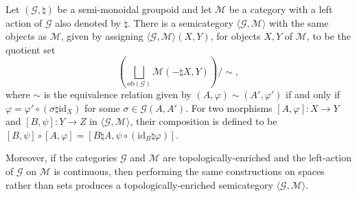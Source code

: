 \documentclass[AHL,Unicode,published]{cedram}
\newcommand{\obj}{\ensuremath{\mathrm{ob}}}
\newcommand{\id}{\mathrm{id}}
\newcommand{\cG}{\mathcal{G}}
\newcommand{\cM}{\mathcal{M}}
\begin{document}
\begin{prop}\label{prop:topological-Quillen}
Let $(\cG,\natural)$ be a semi-monoidal groupoid and let $\cM$ be a category with a left action of $\cG$ also denoted by $\natural$. There is a semicategory $\langle \cG,\cM \rangle$ with the same objects as $\cM$, given by assigning $\langle \cG,\cM \rangle(X,Y)$, for objects $X,Y$ of $\cM$, to be the quotient set
\[
\left(\bigsqcup_{\obj(\cG)} \cM(- \natural X,Y) \right) / {\sim},
\]
where $\sim$ is the equivalence relation given by $(A,\varphi) \sim (A',\varphi')$ if and only if $\varphi = \varphi' \circ (\sigma \natural \id_{X})$ for some $\sigma \in \cG(A,A')$. For two morphisms $[A,\varphi] \colon X\rightarrow Y$ and $[B,\psi] \colon Y\rightarrow Z$ in $\langle \cG,\cM\rangle $, their composition is defined to be $[B,\psi]\circ[A,\varphi]=[B\natural A,\psi\circ(\id_{B}\natural\varphi)]$.

Moreover, if the categories $\cG$ and $\cM$ are topologically-enriched and the left-action of $\cG$ on $\cM$ is continuous, then performing the same constructions on spaces rather than sets produces a topologically-enriched semicategory $\langle \cG,\cM \rangle$.
\end{prop}
\end{document}
